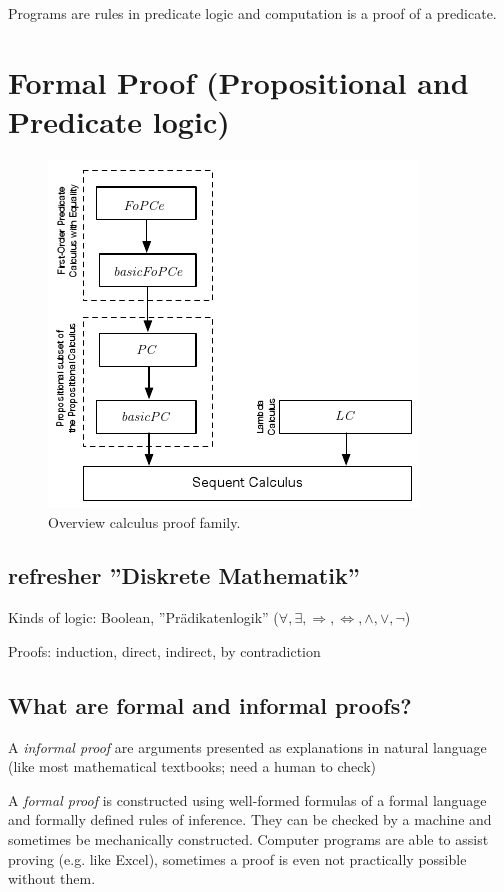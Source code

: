 Programs are rules in predicate logic and computation is a proof of a predicate.



\section{Formal Proof (Propositional and Predicate logic)}

\begin{figure}
	\centering
	\includegraphics[width=0.7\linewidth]{images/sequent_calculus_overview}
	\caption{Overview calculus proof family.}
	\label{fig:sequentcalculusoverview}
\end{figure}

\subsection{refresher ''Diskrete Mathematik''}
Kinds of logic: Boolean, ''Prädikatenlogik'' ($\forall,\exists, \Rightarrow, \Leftrightarrow, \wedge, \vee, \neg$)

Proofs: induction, direct, indirect, by contradiction

\subsection{What are formal and informal proofs?}
A \emph{informal proof} are arguments presented as explanations in natural language (like most mathematical textbooks; need a human to check)

A \emph{formal proof} is constructed using well-formed formulas of a formal language and formally defined rules of inference.
 They can be checked by a machine and sometimes be mechanically constructed. Computer programs are able to assist proving (e.g. like Excel), sometimes a proof is even not practically possible without them.

